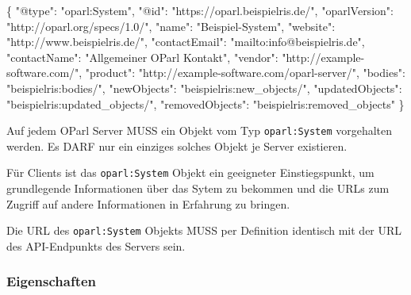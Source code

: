 \documentclass[,a4paper]{article}
\newenvironment{Shaded}{}{}
\newcommand{\DataTypeTok}[1]{\textcolor[rgb]{0.56,0.13,0.00}{{#1}}}
\newcommand{\StringTok}[1]{\textcolor[rgb]{0.25,0.44,0.63}{{#1}}}
\newcommand{\FunctionTok}[1]{\textcolor[rgb]{0.02,0.16,0.49}{{#1}}}
\begin{document}
\begin{Shaded}
\begin{Highlighting}[]
\FunctionTok{\{}
    \DataTypeTok{"@type"}\FunctionTok{:} \StringTok{"oparl:System"}\FunctionTok{,}
    \DataTypeTok{"@id"}\FunctionTok{:} \StringTok{"https://oparl.beispielris.de/"}\FunctionTok{,}
    \DataTypeTok{"oparlVersion"}\FunctionTok{:} \StringTok{"http://oparl.org/specs/1.0/"}\FunctionTok{,}
    \DataTypeTok{"name"}\FunctionTok{:} \StringTok{"Beispiel-System"}\FunctionTok{,}
    \DataTypeTok{"website"}\FunctionTok{:} \StringTok{"http://www.beispielris.de/"}\FunctionTok{,}
    \DataTypeTok{"contactEmail"}\FunctionTok{:} \StringTok{"mailto:info@beispielris.de"}\FunctionTok{,}
    \DataTypeTok{"contactName"}\FunctionTok{:} \StringTok{"Allgemeiner OParl Kontakt"}\FunctionTok{,}
    \DataTypeTok{"vendor"}\FunctionTok{:} \StringTok{"http://example-software.com/"}\FunctionTok{,}
    \DataTypeTok{"product"}\FunctionTok{:} \StringTok{"http://example-software.com/oparl-server/"}\FunctionTok{,}
    \DataTypeTok{"bodies"}\FunctionTok{:} \StringTok{"beispielris:bodies/"}\FunctionTok{,}
    \DataTypeTok{"newObjects"}\FunctionTok{:} \StringTok{"beispielris:new_objects/"}\FunctionTok{,}
    \DataTypeTok{"updatedObjects"}\FunctionTok{:} \StringTok{"beispielris:updated_objects/"}\FunctionTok{,}
    \DataTypeTok{"removedObjects"}\FunctionTok{:} \StringTok{"beispielris:removed_objects"}
\FunctionTok{\}}
\end{Highlighting}
\end{Shaded}

Auf jedem OParl Server MUSS ein Objekt vom Typ \texttt{oparl:System}
vorgehalten werden. Es DARF nur ein einziges solches Objekt je Server
existieren.

Für Clients ist das \texttt{oparl:System} Objekt ein geeigneter
Einstiegspunkt, um grundlegende Informationen über das Sytem zu bekommen
und die URLs zum Zugriff auf andere Informationen in Erfahrung zu
bringen.

Die URL des \texttt{oparl:System} Objekts MUSS per Definition identisch
mit der URL des API-Endpunkts des Servers sein.

\subsubsection{Eigenschaften}\label{eigenschaften}
\end{document}
